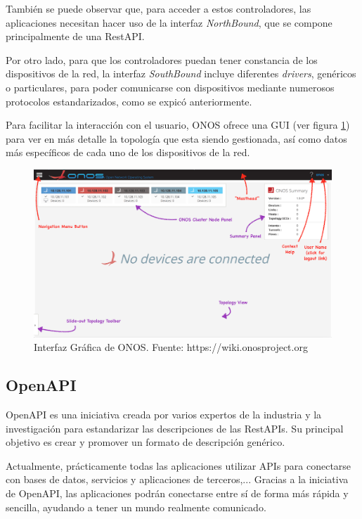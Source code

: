 También se puede observar que, para acceder a estos controladores, las aplicaciones necesitan hacer uso de la interfaz \textit{NorthBound}, que se compone principalmente de una RestAPI.

Por otro lado, para que los controladores puedan tener constancia de los dispositivos de la red, la interfaz \textit{SouthBound} incluye diferentes \textit{drivers}, genéricos o particulares, para poder comunicarse con dispositivos mediante numerosos protocolos estandarizados, como se expicó anteriormente.

Para facilitar la interacción con el usuario, ONOS ofrece una GUI (ver figura \ref{fig:onosgui}) para ver en más detalle la topología que esta siendo gestionada, así como datos más específicos de cada uno de los dispositivos de la red. 

\begin{figure}[!ht]
	\centering
	\includegraphics[width=0.8\linewidth]{imagenes/onos_gui}
	\caption{Interfaz Gráfica de ONOS. 
		Fuente: https://wiki.onosproject.org}
	\label{fig:onosgui}
\end{figure}

\subsection{OpenAPI}
\label{subsec:openapi}

OpenAPI es una iniciativa creada por varios expertos de la industria y la investigación para estandarizar las descripciones de las RestAPIs. Su principal objetivo es crear y promover un formato de descripción genérico.

Actualmente, prácticamente todas las aplicaciones utilizar APIs para conectarse con bases de datos, servicios y aplicaciones de terceros,... Gracias a la iniciativa de OpenAPI, las aplicaciones podrán conectarse entre sí de forma más rápida y sencilla, ayudando a tener un mundo realmente comunicado.

